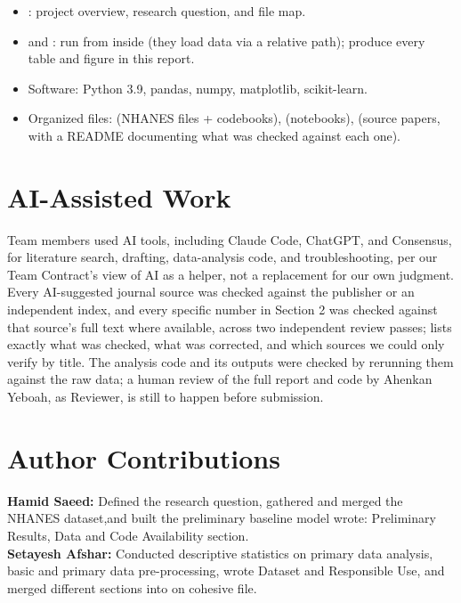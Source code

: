 \documentclass[conference]{IEEEtran}
\begin{document}
\begin{itemize}
\item {}: project overview, research question, and file map.
\item {} and : run from inside  (they load data via a relative  path); produce every table and figure in this report.
\item Software: Python 3.9, pandas, numpy, matplotlib, scikit-learn.
\item Organized files:  (NHANES files + codebooks),  (notebooks),  (source papers, with a README documenting what was checked against each one).
\end{itemize}


\section*{AI-Assisted Work}

Team members used AI tools, including Claude Code, ChatGPT, and Consensus, for literature search, drafting, data-analysis code, and troubleshooting, per our Team Contract's view of AI as a helper, not a replacement for our own judgment. Every AI-suggested journal source was checked against the publisher or an independent index, and every specific number in Section 2 was checked against that source's full text where available, across two independent review passes;  lists exactly what was checked, what was corrected, and which sources we could only verify by title. The analysis code and its outputs were checked by rerunning them against the raw data; a human review of the full report and code by Ahenkan Yeboah, as Reviewer, is still to happen before submission.


\section*{Author Contributions}

\noindent\textbf{Hamid Saeed:} Defined the research question, gathered and merged the NHANES dataset,and built the preliminary baseline model wrote: Preliminary Results, Data and Code Availability section.\\
\noindent\textbf{Setayesh Afshar:} Conducted descriptive statistics on primary data analysis, basic and primary data pre-processing, wrote Dataset and Responsible Use, and merged different sections into on cohesive file. \\
\end{document}
